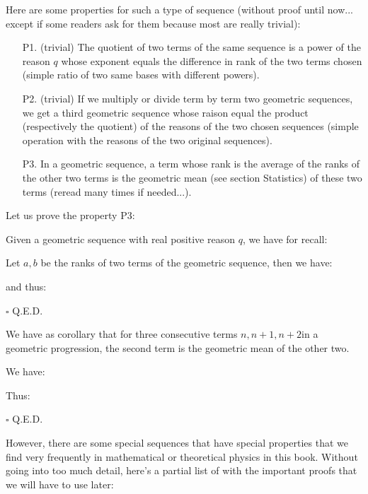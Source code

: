 Here are some properties for such a type of sequence (without proof until now... except if some readers ask for them because most are really trivial):
	\begin{enumerate}
		\item[P1.] (trivial) The quotient of two terms of the same sequence is a power of the reason $q$ whose exponent equals the difference in rank of the two terms chosen (simple ratio of two same bases with different powers).
		\item[P2.] (trivial) If we multiply or divide term by term two geometric sequences, we get a third geometric sequence whose raison equal the product (respectively the quotient) of the reasons of the two chosen sequences (simple operation with the reasons of the two original sequences).
		\item[P3.] In a geometric sequence, a term whose rank is the average of the ranks of the other two terms is the geometric mean (see section Statistics) of these two terms (reread many times if needed...).
	\end{enumerate}
Let us prove the property P3:
\begin{dem}
	Given a geometric sequence with real positive reason $q$, we have for recall:
	
Let $a, b$ be the ranks of two terms of the geometric sequence, then we have:
	
and thus:
	
	\begin{flushright}
		$\square$  Q.E.D.
	\end{flushright}
\end{dem}

	\begin{corollary}
	We have as corollary that for three consecutive terms $n,n+1,n+2$in a geometric progression, the second term is the geometric mean of the other two.
	\end{corollary}
	\begin{dem}
		We have:
		
Thus:	
		
	\begin{flushright}
		$\square$  Q.E.D.
	\end{flushright}
	\end{dem}
However, there are some special sequences that have special properties that we find very frequently in mathematical or theoretical physics in this book. Without going into  too much detail, here's a partial list of with the important proofs that we will have to use later:

